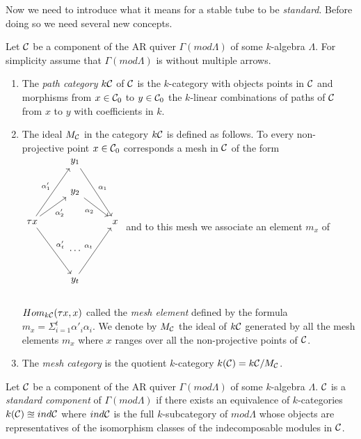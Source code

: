 \indent Now we need to introduce what it means for a stable tube to be \textit{standard}. Before doing so we need several new concepts.\\
\begin{definition}
\cite{SS06} Let $\mathcal{C}$ be a component of the AR quiver $\Gamma(mod \Lambda)$ of some $k$-algebra $\Lambda$. For simplicity assume that $\Gamma(mod \Lambda)$ is without multiple arrows.
\begin{enumerate}
\item The \textit{path category} $k\mathcal{C}$ of $\mathcal{C}$ is the $k$-category with objects points in $\mathcal{C}$ and morphisms from $x\in\mathcal{C}_0$ to $y\in\mathcal{C}_0$ the $k$-linear combinations of paths of $\mathcal{C}$ from $x$ to $y$ with coefficients in $k$.
\item The ideal $M_{\mathcal{C}}$ in the category $k\mathcal{C}$ is defined as follows. To every non-projective point $x\in\mathcal{C}_0$ corresponds a mesh in $\mathcal{C}$ of the form $\begin{tikzcd}
 &y_1\arrow[ddr,"\alpha_1"]& \\
 &y_2\arrow[swap,dr,"\alpha_2"]& \\
 \tau x\arrow[uur,"\alpha'_1"]\arrow[swap,ur,"\alpha'_2"]\arrow[ddr,"\alpha'_t"] & &x\\
 &\cdots &\\
 &y_t \arrow[uur,"\alpha_t"]&\\
\end{tikzcd}$ and to this mesh we associate an element $m_x$ of $Hom_{k\mathcal{C}}(\tau x,x)$ called the \textit{mesh element} defined by the formula $m_x = \Sigma_{i=1}^t \alpha'_i\alpha_i$. We denote by $M_{\mathcal{C}}$ the ideal of $k\mathcal{C}$ generated by all the mesh elements $m_x$ where $x$ ranges over all the non-projective points of $\mathcal{C}$.
\item The \textit{mesh category} is the quotient $k$-category $k(\mathcal{C}) = k\mathcal{C}/M_{\mathcal{C}}$.
\end{enumerate}
\end{definition}
\begin{definition}
\cite{SS06} Let $\mathcal{C}$ be a component of the AR quiver $\Gamma(mod \Lambda)$ of some $k$-algebra $\Lambda$. $\mathcal{C}$ is a \textit{standard component} of $\Gamma(mod \Lambda)$ if there exists an equivalence of $k$-categories $k(\mathcal{C})\approxeq ind\mathcal{C}$ where $ind\mathcal{C}$ is the full $k$-subcategory of $mod \Lambda$ whose objects are representatives of the isomorphism classes of the indecomposable modules in $\mathcal{C}$.
\end{definition}
